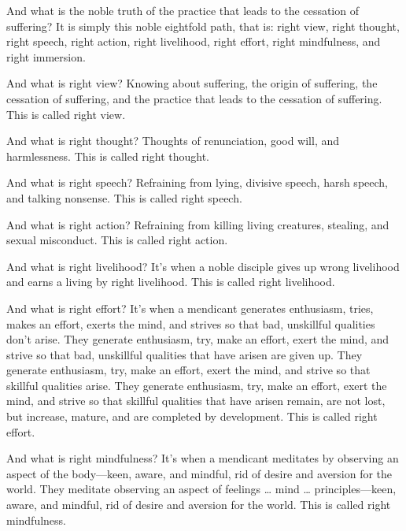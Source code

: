 \documentclass[12pt,openany]{book}%
\begin{document}
And what is the noble truth of the practice that leads to the cessation of suffering? It is simply this noble eightfold path, that is: right view, right thought, right speech, right action, right livelihood, right effort, right mindfulness, and right immersion. 

And what is right view? Knowing about suffering, the origin of suffering, the cessation of suffering, and the practice that leads to the cessation of suffering. This is called right view. 

And what is right thought? Thoughts of renunciation, good will, and harmlessness. This is called right thought. 

And what is right speech? Refraining from lying, divisive speech, harsh speech, and talking nonsense. This is called right speech. 

And what is right action? Refraining from killing living creatures, stealing, and sexual misconduct. This is called right action. 

And what is right livelihood? It’s when a noble disciple gives up wrong livelihood and earns a living by right livelihood. This is called right livelihood. 

And what is right effort? It’s when a mendicant generates enthusiasm, tries, makes an effort, exerts the mind, and strives so that bad, unskillful qualities don’t arise. They generate enthusiasm, try, make an effort, exert the mind, and strive so that bad, unskillful qualities that have arisen are given up. They generate enthusiasm, try, make an effort, exert the mind, and strive so that skillful qualities arise. They generate enthusiasm, try, make an effort, exert the mind, and strive so that skillful qualities that have arisen remain, are not lost, but increase, mature, and are completed by development. This is called right effort. 

And what is right mindfulness? It’s when a mendicant meditates by observing an aspect of the body—keen, aware, and mindful, rid of desire and aversion for the world. They meditate observing an aspect of feelings … mind … principles—keen, aware, and mindful, rid of desire and aversion for the world. This is called right mindfulness. 
\end{document}
